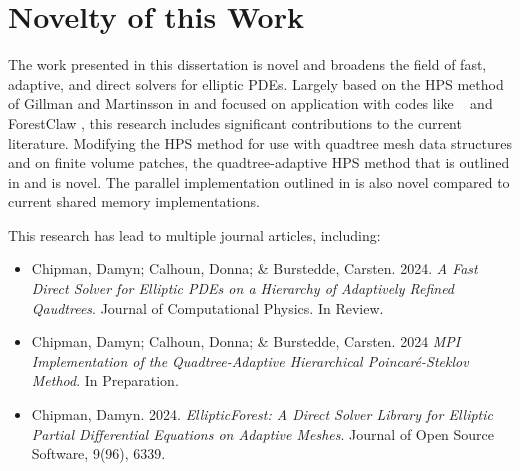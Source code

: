 \section{Novelty of this Work}

The work presented in this dissertation is novel and broadens the field of fast, adaptive, and direct solvers for elliptic PDEs. Largely based on the HPS method of Gillman and Martinsson in \citep{gillman2014direct,martinsson2019fast} and focused on application with codes like \pforest\ \citep{burstedde2011p4est,burstedde2020parallel} and ForestClaw \citep{calhoun2017forestclaw}, this research includes significant contributions to the current literature. Modifying the HPS method for use with quadtree mesh data structures and on finite volume patches, the quadtree-adaptive HPS method that is outlined in  and  is novel. The parallel implementation outlined in  is also novel compared to current shared memory implementations.

This research has lead to multiple journal articles, including:
\begin{itemize}
    \item{Chipman, Damyn; Calhoun, Donna; \& Burstedde, Carsten. 2024. {\em A Fast Direct Solver for Elliptic PDEs on a Hierarchy of Adaptively Refined Qaudtrees}. Journal of Computational Physics. In Review.}
    \item{Chipman, Damyn; Calhoun, Donna; \& Burstedde, Carsten. 2024 {\em MPI Implementation of the Quadtree-Adaptive Hierarchical Poincar\'e-Steklov Method}. In Preparation.}
    \item{Chipman, Damyn. 2024. {\em EllipticForest: A Direct Solver Library for Elliptic Partial Differential Equations on Adaptive Meshes}. Journal of Open Source Software, 9(96), 6339.}
\end{itemize}